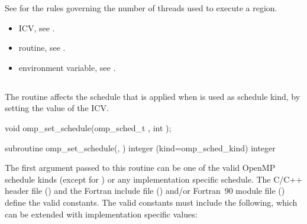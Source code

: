 See  
for the rules governing the number of threads used to 
execute a\linebreak {} region. 

\crossreferences
\begin{itemize}
\item {} ICV, see 
.

\item {} routine, see 
.

\item {} environment variable, see 
.
\end{itemize}









\subsection{}
\label{subsec:omp_set_schedule}
\summary
The  routine affects the schedule that is applied when  
is used as schedule kind, by setting the value of the  ICV. 

\format
\ccppspecificstart
\begin{boxedcode}
void omp\_set\_schedule(omp\_sched\_t , int );
\end{boxedcode}
\ccppspecificend

\fortranspecificstart
\begin{boxedcode}
subroutine omp\_set\_schedule(, ) 
integer (kind=omp\_sched\_kind) 
integer 
\end{boxedcode}
\fortranspecificend

\constraints
The first argument passed to this routine can be one of the valid OpenMP schedule kinds 
(except for ) or any implementation specific schedule. The C/C++ header file 
() and the Fortran include file () and/or Fortran~90 module file 
() define the valid constants. The valid constants must include the following, 
which can be extended with implementation specific values:

